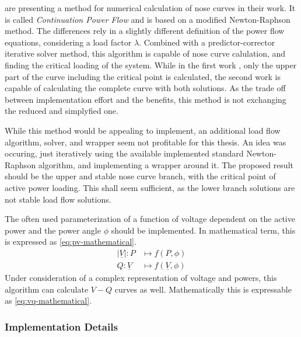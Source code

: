 \textcite{ajjarapu_1992, ajjarapu_2007} are presenting a method for numerical calculation of nose curves in their work. 
It is called {\itshape Continuation Power Flow} and is based on a modified Newton-Raphson method.
The differences rely in a slightly different definition of the power flow equations, considering a load factor $\lambda$.
Combined with a predictor-corrector iterative solver method, this algorithm is capable of nose curve calulation, and finding the critical loading of the system.
While in the first work \autocite{ajjarapu_1992}, only the upper part of the curve including the critical point is calculated, the second work \autocite{ajjarapu_2007} is capable of calculating the complete curve with both solutions. 
As the trade off between implementation effort and the benefits, this method is not exchanging the reduced and simplyfied one.

While this method would be appealing to implement, an additional load flow algorithm, solver, and wrapper seem not profitable for this thesis.
An idea was occuring, just iteratively using the available implemented standard Newton-Raphson algorithm, and implementing a wrapper around it.
The proposed result should be the upper and stable nose curve branch, with the critical point of active power loading.
This shall seem sufficient, as the lower branch solutions are not stable load flow solutions.

The often used parameterization of a function of voltage dependent on the active power and the power angle $\phi$ should be implemented.
In mathematical term, this is expressed as \autoref{eq:pv-mathematical}.
\begin{align}
        \vert \underline{V} \vert : P &\mapsto f(P, \phi) \label{eq:pv-mathematical} \\[6pt]
        Q : \underline{V} &\mapsto f(\underline{V}, \phi) \label{eq:vq-mathematical}
\end{align}
Under consideration of a complex representation of voltage and powers, this algorithm can calculate $V-Q$ curves as well. 
Mathematically this is expressable as \autoref{eq:vq-mathematical}.

\subsubsection{Implementation Details}


